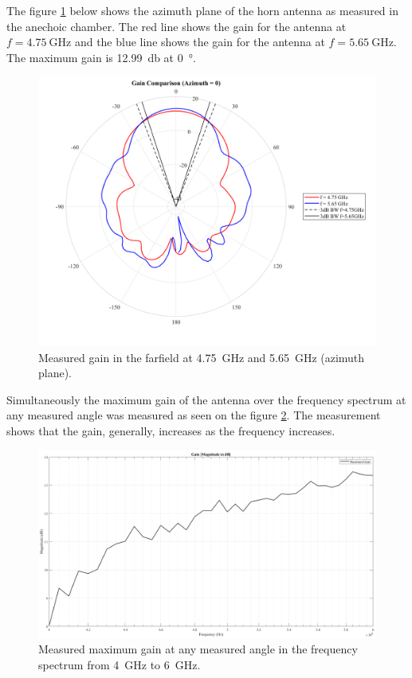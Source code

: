 The figure \ref{fig:horn_azimuth} below shows the azimuth plane of the horn antenna as measured in the anechoic chamber. The red line shows the gain for the antenna at $f=\SI{4.75}{\giga\hertz}$ and the blue line shows the gain for the antenna at $f=\SI{5.65}{\giga\hertz}$. The maximum gain is \SI{12.99}{\decibel} at \SI{0}{\degree}. 
\begin{figure}[H]
    \centering
    \includegraphics[width=1\textwidth]{figures/horn_azimuth.png}
    \caption{Measured gain in the farfield at \SI{4.75}{\giga\hertz} and \SI{5.65}{\giga\hertz} (azimuth plane).} 
    \label{fig:horn_azimuth}
\end{figure}

Simultaneously the maximum gain of the antenna over the frequency spectrum at any measured angle was measured as seen on the figure \ref{fig:gain_meas}. The measurement shows that the gain, generally, increases as the frequency increases.
\begin{figure}[H]
    \centering
    \includegraphics[width=1\textwidth]{figures/gain_meas.png}
    \caption{Measured maximum gain at any measured angle in the frequency spectrum from \SI{4}{\giga\hertz} to \SI{6}{\giga\hertz}.} \label{fig:gain_meas}
\end{figure}

